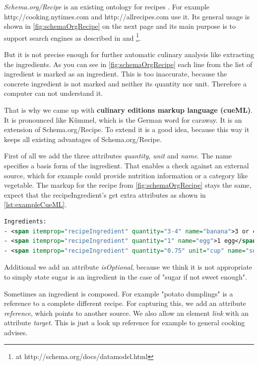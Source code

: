 \documentclass[12pt, twoside]{report}
\begin{document}
\textit{Schema.org/Recipe} is an existing ontology for recipes \parencite{schemaOrg}. For example http://cooking.nytimes.com and http://allrecipes.com use it. Its general usage is shown in \cref{fig:schemaOrgRecipe} on the next page and its main purpose is to support search engines as described in \parencite{foodBlogger} and \parencite{schemaOrg} \footnote{at http://schema.org/docs/datamodel.html}.

But it is not precise enough for further automatic culinary analysis like extracting the ingredients. As you can see in \cref{fig:schemaOrgRecipe} each line from the list of ingredient is marked as an ingredient. This is too inaccurate, because the concrete ingredient is not marked and neither its quantity nor unit. Therefore a computer can not understand it.

That is why we came up with \textbf{culinary editions markup language (cueML)}. It is pronounced like Kümmel, which is the German word for caraway. It is an extension of Schema.org/Recipe. To extend it is a good idea, because this way it keeps all existing advantages of Schema.org/Recipe.

First of all we add the three attributes \textit{quantity}, \textit{unit} and \textit{name}. The name specifies a basis form of the ingredient. That enables a check against an external source, which for example could provide nutrition information or a category like vegetable. The markup for the recipe from \cref{fig:schemaOrgRecipe} stays the same, expect that the recipeIngredient's get extra attributes as shown in \cref{lst:exampleCueML}.

\begin{minipage}{\linewidth} %
\begin{lstlisting}[language=XML, caption={Example for cueML}, label=lst:exampleCueML]
Ingredients:
- <span itemprop="recipeIngredient" quantity="3-4" name="banana">3 or 4 ripe bananas, smashed</span>
- <span itemprop="recipeIngredient" quantity="1" name="egg">1 egg</span>
- <span itemprop="recipeIngredient" quantity="0.75" unit="cup" name="sugar">3/4 cup of sugar</span>
\end{lstlisting}
\end{minipage}

Additional we add an attribute \textit{isOptional}, because we think it is not appropriate to simply state sugar is an ingredient in the case of "sugar if not sweet enough". 

Sometimes an ingredient is composed. For example "potato dumplings" is a reference to a complete different recipe. For capturing this, we add an attribute \textit{reference}, which points to another source. We also allow an element \textit{link} with an attribute \textit{target}. This is just a look up reference for example to general cooking advises. 
\end{document}
